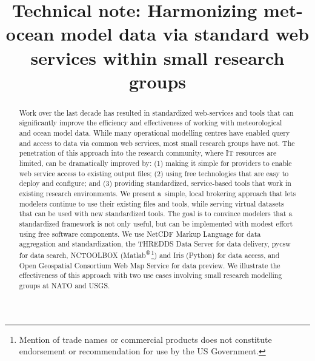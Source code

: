 \documentclass[osd, online, hvmath]{copernicus}
\begin{document}
\hack{\sloppy}

\title{Technical note: Harmonizing met-ocean model data via standard
  web services within small research groups}







\published{}



\maketitle


\begin{abstract}
  Work over the last decade has resulted in standardized web-services
  and tools that can significantly improve the efficiency and
  effectiveness of working with meteorological and ocean model
  data. While many operational modelling centres have enabled query and
  access to data via common web services, most small research groups
  have not. The penetration of this approach into the research
  community, where IT resources are limited, can be dramatically
  improved by: (1) making it simple for providers to enable web service
  access to existing output files; (2) using free technologies that are easy to deploy and configure; and (3) providing standardized, service-based tools that work in existing
  research environments. We present
  a~simple, local brokering approach that lets modelers continue to use their existing files and tools, while
  serving virtual datasets that can be used with new standardized tools.  The goal is to convince modelers that a standardized framework is not only useful, but can be implemented with modest effort using free software components. We use 
  NetCDF Markup Language for data aggregation and standardization, the THREDDS Data Server  for data delivery, pycsw for data search, NCTOOLBOX
  (Matlab$^{\text{\textregistered}}$\footnote{Mention of trade names
    or commercial products does not constitute endorsement or
    recommendation for use by the US Government.}) and Iris (Python)
  for data access, and Open Geospatial Consortium Web Map Service for
  data preview. We illustrate the effectiveness of this approach with
  two use cases involving small research modelling groups at NATO and
  USGS.
\end{abstract}
\end{document}
